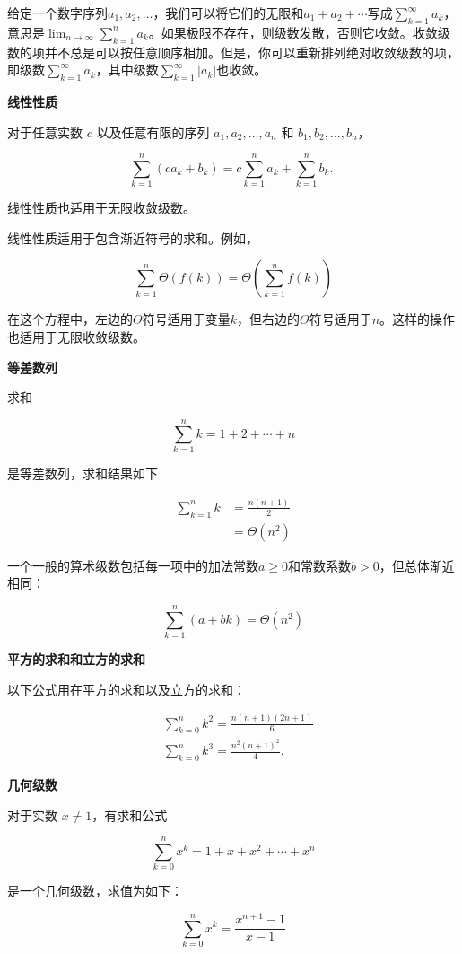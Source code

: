 \documentclass[lang=cn,newtx,10pt,scheme=chinese]{elegantbook}
\begin{document}
给定一个数字序列$a_1,a_2,\ldots$，我们可以将它们的无限和$a_1+a_2+\cdots$写成$\sum_{k=1}^{\infty} a_k$，意思是$\lim _{n \rightarrow \infty} \sum_{k=1}^n a_k$。如果极限不存在，则级数发散，否则它收敛。收敛级数的项并不总是可以按任意顺序相加。但是，你可以重新排列绝对收敛级数的项，即级数$\sum_{k=1}^{\infty} a_k$，其中级数$\sum_{k=1}^{\infty}\left|a_k\right|$也收敛。

\textbf{线性性质}

对于任意实数 $c$ 以及任意有限的序列 $a_1, a_2, \ldots, a_n$ 和 $b_1, b_2, \ldots, b_n$，

$$
\sum_{k=1}^n\left(c a_k+b_k\right)=c \sum_{k=1}^n a_k+\sum_{k=1}^n b_k \text {. }
$$

线性性质也适用于无限收敛级数。

线性性质适用于包含渐近符号的求和。例如，

$$
\sum_{k=1}^n \Theta(f(k))=\Theta\left(\sum_{k=1}^n f(k)\right)
$$

在这个方程中，左边的$\Theta$符号适用于变量$k$，但右边的$\Theta$符号适用于$n$。这样的操作也适用于无限收敛级数。

\textbf{等差数列}

求和

$$
\sum_{k=1}^n k=1+2+\cdots+n
$$

是等差数列，求和结果如下

$$
\begin{aligned}
\sum_{k=1}^n k & =\frac{n(n+1)}{2} \\
& =\Theta\left(n^2\right)
\end{aligned}
$$

一个一般的算术级数包括每一项中的加法常数$a \geq 0$和常数系数$b>0$，但总体渐近相同：

$$
\sum_{k=1}^n(a+b k)=\Theta\left(n^2\right)
$$

\textbf{平方的求和和立方的求和}

以下公式用在平方的求和以及立方的求和：

$$
\begin{aligned}
& \sum_{k=0}^n k^2=\frac{n(n+1)(2 n+1)}{6} \\
& \sum_{k=0}^n k^3=\frac{n^2(n+1)^2}{4} .
\end{aligned}
$$

\textbf{几何级数}

对于实数 $x \neq 1$，有求和公式

$$
\sum_{k=0}^n x^k=1+x+x^2+\cdots+x^n
$$

是一个几何级数，求值为如下：

$$
\sum_{k=0}^n x^k=\frac{x^{n+1}-1}{x-1}
$$
\end{document}
